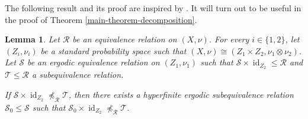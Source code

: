 \documentclass[11pt]{amsart}
\numberwithin{equation}{section}
\theoremstyle{plain}
\newtheorem{lem}[thm]{Lemma}
\theoremstyle{definition}
\newcommand{\id}{\operatorname{id}}
\begin{document}
The following result and its proof are inspired by \cite[Corollary F.14]{BO08}. It will turn out to be useful in the proof of Theorem \ref{main-theorem-decomposition}.


\begin{lem}\label{lem-key-intertwining}
Let $\mathscr R$ be an equivalence relation on $(X, \nu)$. For every $i\in\{1,2\}$, let $(Z_i,\nu_i)$ be a standard probability space such that $(X,\nu)\cong (Z_1\times Z_2, \nu_1\otimes\nu_2)$. Let $\mathscr S$ be an ergodic equivalence relation on $(Z_1, \nu_1)$ such that $\mathscr S\times \id_{Z_2}\leq \mathscr R$ and $\mathscr T \leq \mathscr R$ a subequivalence relation. 

If $\mathscr S \times \id_{Z_2} \npreceq_{\mathscr R}  \mathscr T$, then there exists a hyperfinite ergodic subequivalence relation $\mathscr S_0 \leq \mathscr S$ such that  $\mathscr S_0 \times \id_{Z_2} \npreceq_{\mathscr R}  \mathscr T$. 
\end{lem}
\end{document}
